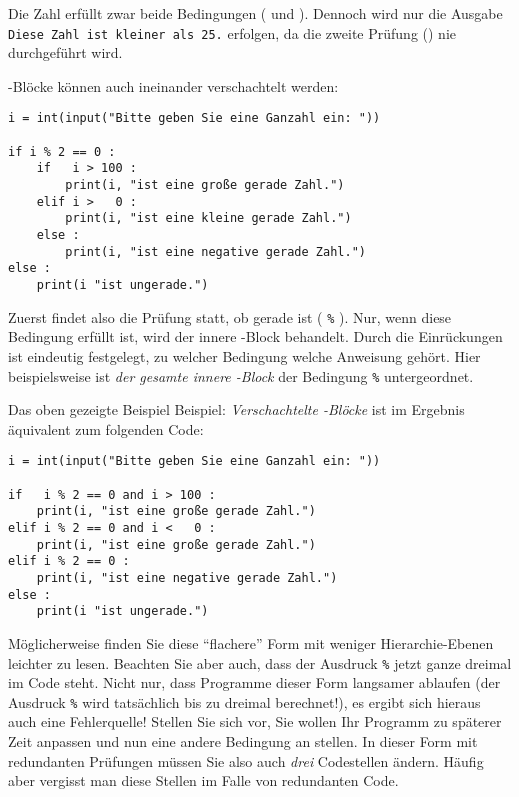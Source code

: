 Die Zahl  erfüllt zwar beide Bedingungen ( und ). Dennoch wird nur die Ausgabe \texttt{Diese Zahl ist kleiner als 25.} erfolgen, da die zweite Prüfung () nie durchgeführt wird.

-Blöcke können auch ineinander verschachtelt werden:
\begin{codebox}
\begin{verbatim}
i = int(input("Bitte geben Sie eine Ganzahl ein: "))

if i % 2 == 0 :
    if   i > 100 :
        print(i, "ist eine große gerade Zahl.")
    elif i >   0 :
        print(i, "ist eine kleine gerade Zahl.")
    else :
        print(i, "ist eine negative gerade Zahl.")
else :
    print(i "ist ungerade.")
\end{verbatim}
\end{codebox}

Zuerst findet also die Prüfung statt, ob  gerade ist 
( \texttt{\%} ).		%
Nur, wenn diese Bedingung erfüllt ist, wird der innere -Block behandelt. Durch die Einrückungen ist eindeutig festgelegt, zu welcher Bedingung welche Anweisung gehört. Hier beispielsweise ist \emph{der gesamte innere -Block} der Bedingung 
 \texttt{\%} 		%
untergeordnet.

Das oben gezeigte Beispiel Beispiel: \emph{Verschachtelte -Blöcke} ist im Ergebnis äquivalent zum folgenden Code:
\begin{warnbox}[Beispiel: Redundanz bei \texttt{if} mit logischen Operatoren, leftupper=7mm]
\begin{verbatim}
i = int(input("Bitte geben Sie eine Ganzahl ein: "))

if   i % 2 == 0 and i > 100 :
    print(i, "ist eine große gerade Zahl.")
elif i % 2 == 0 and i <   0 :
    print(i, "ist eine große gerade Zahl.")
elif i % 2 == 0 :
    print(i, "ist eine negative gerade Zahl.")
else :
    print(i "ist ungerade.")
\end{verbatim}
\end{warnbox}

Möglicherweise finden Sie diese \enquote{flachere} Form mit weniger Hierarchie-Ebenen leichter zu lesen. Beachten Sie aber auch, dass der Ausdruck
 \texttt{\%} 		%
jetzt ganze dreimal im Code steht. Nicht nur, dass Programme dieser Form langsamer ablaufen (der Ausdruck
 \texttt{\%} 		%
wird tatsächlich bis zu dreimal berechnet!), es ergibt sich hieraus auch eine Fehlerquelle! Stellen Sie sich vor, Sie wollen Ihr Programm zu späterer Zeit anpassen und nun eine andere Bedingung an  stellen. In dieser Form mit redundanten Prüfungen müssen Sie also auch \emph{drei} Codestellen ändern. Häufig aber vergisst man diese Stellen im Falle von redundanten Code.


